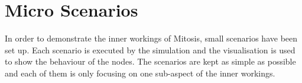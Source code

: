 \section{Micro Scenarios}
In order to demonstrate the inner workings of Mitosis, small scenarios have been set up. Each scenario is executed by the simulation and the visualisation is used to show the behaviour of the nodes. The scenarios are kept as simple as possible and each of them is only focusing on one sub-aspect of the inner workings.
